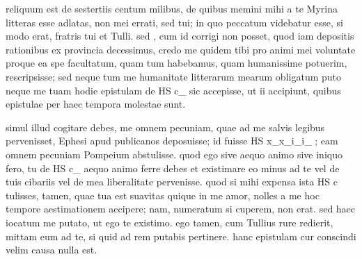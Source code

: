  reliquum est de sestertiis centum milibus, de quibus memini mihi a te Myrina litteras esse adlatas, non mei errati, sed tui; in quo peccatum videbatur esse, si modo erat, fratris tui et Tulli. sed , cum id corrigi non posset, quod iam depositis rationibus ex provincia decessimus, credo me quidem tibi pro animi mei voluntate proque ea spe facultatum, quam tum habebamus, quam humanissime potuerim, rescripsisse; sed neque tum me humanitate litterarum mearum obligatum puto neque me tuam hodie epistulam de HS c_ sic accepisse, ut ii accipiunt, quibus epistulae per haec tempora molestae sunt.

 simul illud cogitare debes, me omnem pecuniam, quae ad me salvis legibus pervenisset, Ephesi apud publicanos deposuisse; id fuisse HS x_x_i_i_ ; eam omnem pecuniam Pompeium abstulisse. quod ego sive aequo animo sive iniquo fero, tu de HS c_ aequo animo ferre debes et existimare eo minus ad te vel de tuis cibariis vel de mea liberalitate pervenisse. quod si mihi expensa ista HS c tulisses, tamen, quae tua est suavitas quique in me amor, nolles a me hoc tempore aestimationem accipere; nam, numeratum si cuperem, non erat. sed haec iocatum me putato, ut ego te existimo. ego tamen, cum Tullius rure redierit, mittam eum ad te, si quid ad rem putabis pertinere. hanc epistulam cur conscindi velim causa nulla est.
